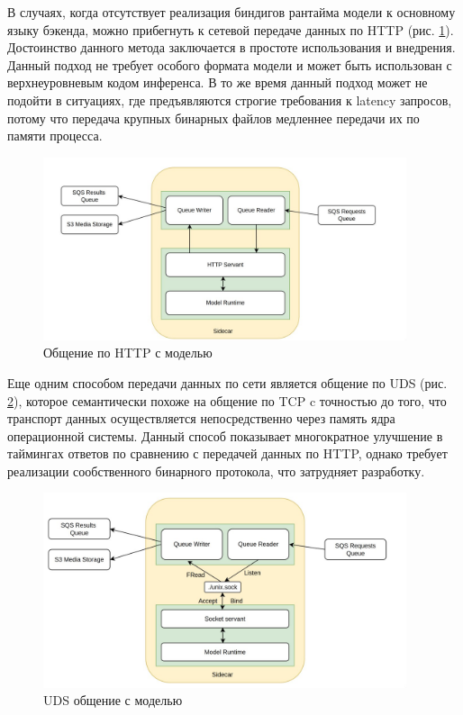 В случаях, когда отсутствует реализация биндигов рантайма модели к основному языку бэкенда,
можно прибегнуть к сетевой передаче данных по HTTP (рис. \ref{fig:side2}). Достоинство данного метода
заключается в простоте использования и внедрения. Данный подход не требует особого формата модели и может
быть использован с верхнеуровневым кодом инференса. В то же время данный подход может не подойти
в ситуациях, где предъявляются строгие требования к latency запросов, потому что передача крупных
бинарных файлов медленнее передачи их по памяти процесса.

\begin{footnotesize}
\begin{figure}[H]
  \centering
  \includegraphics[width=0.95\textwidth]{img/side2.jpg}
  \caption{Общение по HTTP с моделью}
    \label{fig:side2}
\end{figure}
\end{footnotesize}

Еще одним способом передачи данных по сети является общение по UDS (рис. \ref{fig:side3}), которое семантически похоже
на общение по TCP c точностью до того, что транспорт данных осуществляется непосредственно через 
память ядра операционной системы. Данный способ показывает многократное улучшение в таймингах ответов
по сравнению с передачей данных по HTTP, однако требует реализации сообственного бинарного протокола, что 
затрудняет разработку.

\begin{footnotesize}
\begin{figure}[H]
  \centering
  \includegraphics[width=0.95\textwidth]{img/side3.jpg}
  \caption{UDS общение с моделью}
    \label{fig:side3}
\end{figure}
\end{footnotesize}

